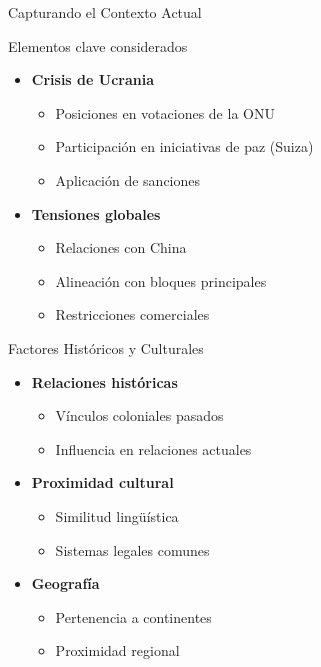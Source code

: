 \documentclass{beamer}
\begin{document}
\begin{frame}{Capturando el Contexto Actual}
    \begin{block}{Elementos clave considerados}
        \begin{itemize}
            \item \textbf{Crisis de Ucrania}
                \begin{itemize}
                    \item Posiciones en votaciones de la ONU
                    \item Participación en iniciativas de paz (Suiza)
                    \item Aplicación de sanciones
                \end{itemize}
            \item \textbf{Tensiones globales}
                \begin{itemize}
                    \item Relaciones con China
                    \item Alineación con bloques principales
                    \item Restricciones comerciales
                \end{itemize}
        \end{itemize}
    \end{block}
\end{frame}

\begin{frame}{Factores Históricos y Culturales}
    \begin{itemize}
        \item \textbf{Relaciones históricas}
            \begin{itemize}
                \item Vínculos coloniales pasados
                \item Influencia en relaciones actuales
            \end{itemize}
        \item \textbf{Proximidad cultural}
            \begin{itemize}
                \item Similitud lingüística
                \item Sistemas legales comunes
            \end{itemize}
        \item \textbf{Geografía}
            \begin{itemize}
                \item Pertenencia a continentes
                \item Proximidad regional
            \end{itemize}
    \end{itemize}
\end{frame}
\end{document}

